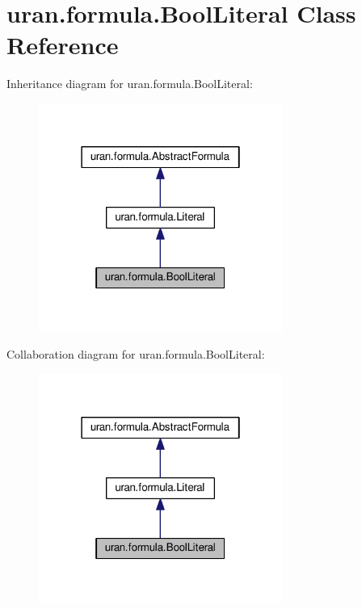 \hypertarget{classuran_1_1formula_1_1_bool_literal}{}\section{uran.\+formula.\+Bool\+Literal Class Reference}
\label{classuran_1_1formula_1_1_bool_literal}


Inheritance diagram for uran.\+formula.\+Bool\+Literal\+:
\nopagebreak
\begin{figure}[H]
\begin{center}
\leavevmode
\includegraphics[width=226pt]{classuran_1_1formula_1_1_bool_literal__inherit__graph}
\end{center}
\end{figure}


Collaboration diagram for uran.\+formula.\+Bool\+Literal\+:
\nopagebreak
\begin{figure}[H]
\begin{center}
\leavevmode
\includegraphics[width=226pt]{classuran_1_1formula_1_1_bool_literal__coll__graph}
\end{center}
\end{figure}
